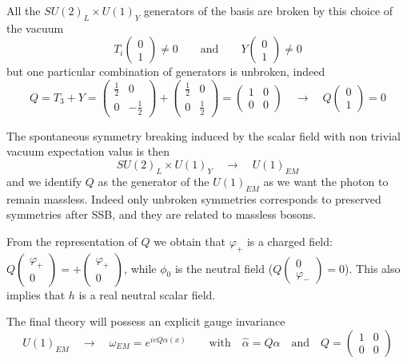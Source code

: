 \documentclass[TheoreticalPhy_ModB.tex]{subfiles}
\begin{document}
All the $SU(2)_L\times U(1)_Y$ generators of the basis are broken by this choice of the vacuum
\[T_i\begin{pmatrix}0\\1\end{pmatrix}\neq0\qquad\text{and}\qquad Y\begin{pmatrix}0\\1\end{pmatrix}\neq0\]
but one particular combination of generators is unbroken, indeed
\[Q=T_3+Y=\begin{pmatrix}\frac12&0\\0&-\frac12\end{pmatrix}+\begin{pmatrix}\frac12&0\\0&\frac12\end{pmatrix}=\begin{pmatrix}1&0\\0&0\end{pmatrix}\quad\to\quad Q\begin{pmatrix}0\\1\end{pmatrix}=0\]

The spontaneous symmetry breaking induced by the scalar field with non trivial vacuum expectation valus is then 
\[SU(2)_L\times U(1)_Y\quad\to\quad U(1)_{EM}\]
and we identify $Q$ as the generator of the $U(1)_{EM}$ as we want the photon to remain massless. Indeed only unbroken symmetries corresponds to preserved symmetries after SSB, and they are related to massless bosons. 

From the representation of $Q$ we obtain that $\varphi_+$ is a charged field: $Q\begin{pmatrix}\varphi_+\\0\end{pmatrix}=+\begin{pmatrix}\varphi_+\\0\end{pmatrix}$, while $\phi_0$ is the neutral  field ($Q\begin{pmatrix}0\\\varphi_-\end{pmatrix}=0$). This also implies that $h$ is a real neutral scalar field. 

The final theory will possess an explicit gauge invariance
\[U(1)_{EM}\quad\to\quad\omega_{EM}=e^{ieQ\alpha(x)}\qquad\text{with}\quad\hat\alpha=Q\alpha\quad\text{and}\quad Q=\begin{pmatrix}1&0\\0&0\end{pmatrix}\]
\end{document}
